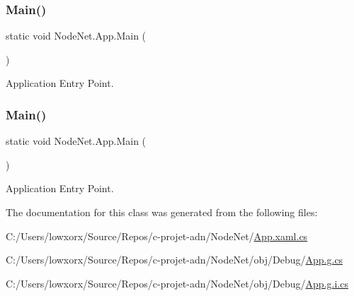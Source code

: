 \subsubsection{\texorpdfstring{Main()}{Main()}\hspace{0.1cm}{\footnotesize\ttfamily [1/2]}}
{\footnotesize\ttfamily static void Node\+Net.\+App.\+Main (\begin{DoxyParamCaption}{ }\end{DoxyParamCaption})\hspace{0.3cm}{\ttfamily [static]}}



Application Entry Point. 

\mbox{\label{class_node_net_1_1_app_a7528fd13a6e2fede888355eeeb5d61ba}} 
\subsubsection{\texorpdfstring{Main()}{Main()}\hspace{0.1cm}{\footnotesize\ttfamily [2/2]}}
{\footnotesize\ttfamily static void Node\+Net.\+App.\+Main (\begin{DoxyParamCaption}{ }\end{DoxyParamCaption})\hspace{0.3cm}{\ttfamily [static]}}



Application Entry Point. 



The documentation for this class was generated from the following files\+:\begin{DoxyCompactItemize}
\item 
C\+:/\+Users/lowxorx/\+Source/\+Repos/c-\/projet-\/adn/\+Node\+Net/\hyperlink{_node_net_2_app_8xaml_8cs}{App.\+xaml.\+cs}\item 
C\+:/\+Users/lowxorx/\+Source/\+Repos/c-\/projet-\/adn/\+Node\+Net/obj/\+Debug/\hyperlink{_node_net_2obj_2_debug_2_app_8g_8cs}{App.\+g.\+cs}\item 
C\+:/\+Users/lowxorx/\+Source/\+Repos/c-\/projet-\/adn/\+Node\+Net/obj/\+Debug/\hyperlink{_node_net_2obj_2_debug_2_app_8g_8i_8cs}{App.\+g.\+i.\+cs}\end{DoxyCompactItemize}
